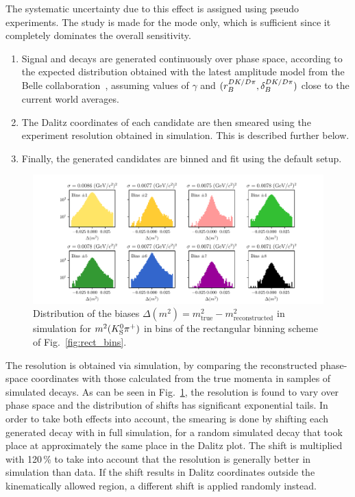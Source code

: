 The systematic uncertainty due to this effect is assigned using pseudo experiments. The study is made for the \DtoKspipi mode only, which is sufficient since it completely dominates the overall sensitivity. 
\begin{enumerate}
    \item Signal \BtoDK and \BtoDpi decays are generated continuously over phase space, according to the expected distribution obtained with the latest amplitude model from the Belle collaboration~\cite{Belle2018}, assuming values of $\gamma$ and $(r_B^{DK/{D}\pi},\delta_B^{DK/{D}\pi})$ close to the current world averages.
    \item The Dalitz coordinates of each candidate are then smeared using the experiment resolution obtained in simulation. This is described further below.
    \item Finally, the generated candidates are binned and fit using the default setup. 
\end{enumerate}
\begin{figure}[tb]
    \centering
    \includegraphics[width=\columnwidth]{figures/analysis/systematics/Dalitz_resolution_rect_bins.pdf}
    \caption{Distribution of the biases $\Delta (m^2) = m^2_\mathrm{true} - m^2_\mathrm{reconstructed}$ in simulation for $m^2({{K}^0_{\mathrm{S}}} {{\pi}^+})$ in bins of the rectangular binning scheme of Fig.~\ref{fig:rect_bins}.}
    \label{fig:dalitz_coord_resolution_and_correlation}
\end{figure}
The resolution is obtained via simulation, by comparing the reconstructed phase-space coordinates with those calculated from the true momenta in samples of simulated \DtoKspipi decays. As can be seen in Fig.~\ref{fig:dalitz_coord_resolution_and_correlation}, the resolution is found to vary over phase space and the distribution of shifts has significant exponential tails. In order to take both effects into account, the smearing is done by shifting each generated decay with  in full \lhcb simulation, for a random simulated decay that took place at approximately the same place in the Dalitz plot. The shift is multiplied with 120\,\% to take into account that the resolution is generally better in simulation than data. If the shift results in Dalitz coordinates outside the kinematically allowed region, a different shift is applied randomly instead.

